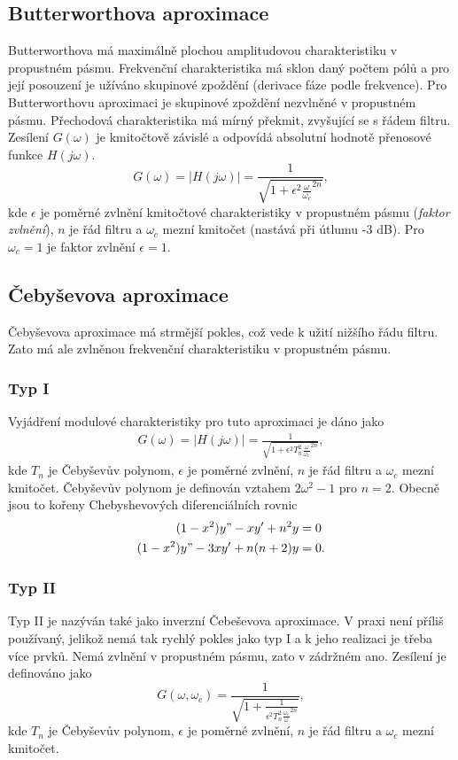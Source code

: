 \subsection{Butterworthova aproximace}
Butterworthova má maximálně plochou amplitudovou charakteristiku v propustném pásmu. Frekvenční charakteristika má sklon daný počtem pólů a pro její posouzení je užíváno skupinové zpoždění (derivace fáze podle frekvence). Pro Butterworthovu aproximaci je skupinové zpoždění nezvlněné v propustném pásmu. Přechodová charakteristika má mírný překmit, zvyšující se s řádem filtru. Zesílení $G(\omega)$ je kmitočtově závislé a odpovídá absolutní hodnotě přenosové funkce $H(j\omega)$.
\begin{equation}
G(\omega) = |H(j\omega)| = \frac{1}{\sqrt{1 + \epsilon ^2 \frac{\omega}{\omega _c}^{2n}}},
\end{equation}
kde $\epsilon$ je poměrné zvlnění kmitočtové charakteristiky v propustném pásmu (\textit{faktor zvlnění}), $n$ je řád filtru a $\omega _c$ mezní kmitočet (nastává při útlumu -3 dB). Pro $\omega _c = 1$ je faktor zvlnění $\epsilon = 1$. 
\subsection{Čebyševova aproximace}
Čebyševova aproximace má strmější pokles, což vede k užití nižšího řádu filtru. Zato má ale zvlněnou frekvenční charakteristiku v propustném pásmu. 
\subsubsection{Typ I}
Vyjádření modulové charakteristiky pro tuto aproximaci je dáno jako
\begin{align}
G(\omega) = |H(j\omega)| = \frac{1}{\sqrt{1 + \epsilon ^2 T_n ^2 \frac{\omega}{\omega _c}^{2n}}},
\end{align}
kde $T_n$ je Čebyševův polynom, $\epsilon$ je poměrné zvlnění, $n$ je řád filtru a $\omega _c$ mezní kmitočet. Čebyševův polynom je definován vztahem $2 \omega ^2 - 1$ pro $n = 2$. Obecně jsou to kořeny Chebyshevových diferenciálních rovnic
\begin{align}
(1 - x^2)y" - xy' + n^2y &= 0\\
(1 - x^2)y" - 3xy' + n(n+2)y &= 0.
\end{align}
\subsubsection{Typ II}
Typ II je nazýván také jako inverzní Čebeševova aproximace. V praxi není příliš používaný, jelikož nemá tak rychlý pokles jako typ I a k jeho realizaci je třeba více prvků. Nemá zvlnění v propustném pásmu, zato v zádržném ano. Zesílení je definováno jako
\begin{equation}
G(\omega, \omega _c) = \frac{1}{\sqrt{1 + \frac{1}{\epsilon ^2 T_n ^2 \frac{\omega _c}{\omega}^{2n}}}},
\end{equation}
kde $T_n$ je Čebyševův polynom, $\epsilon$ je poměrné zvlnění, $n$ je řád filtru a $\omega _c$ mezní kmitočet.
